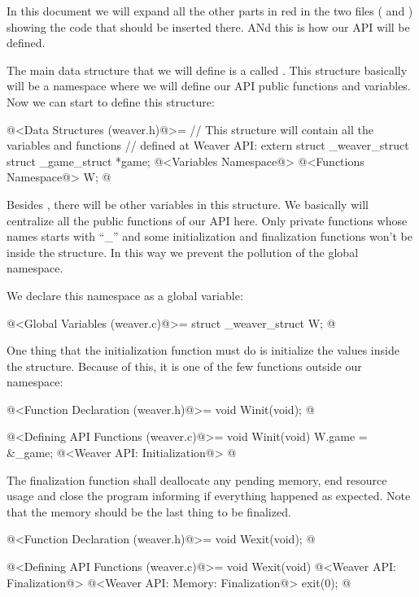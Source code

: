 In this document we will expand all the other parts in red in the two
files ( and ) showing the
code that should be inserted there. ANd this is how our API will be
defined.


The main data structure that we will define is a
 called . This structure
basically will be a namespace where we will define our API public
functions and variables. Now we can start to define this structure:

\iniciocodigo
@<Data Structures (weaver.h)@>=
// This structure will contain all the variables and functions
// defined at Weaver API:
extern struct _weaver_struct{
  struct _game_struct *game;
  @<Variables Namespace@>
  @<Functions Namespace@>
} W;
@
\fimcodigo

Besides , there will be other variables in this
structure. We basically will centralize all the public functions of
our API here. Only private functions whose names starts with ``\_''
and some initialization and finalization functions won't be inside
the  structure. In this way we prevent the pollution of
the global namespace.

We declare this namespace as a global variable:

\iniciocodigo
@<Global Variables (weaver.c)@>=
struct _weaver_struct W;
@
\fimcodigo


One thing that the initialization function must do is initialize the
values inside the  structure. Because of this, it is one
of the few functions outside our namespace:

\iniciocodigo
@<Function Declaration (weaver.h)@>=
void Winit(void);
@
\fimcodigo

\iniciocodigo
@<Defining API Functions (weaver.c)@>=
void Winit(void){
  W.game = &_game;
  @<Weaver API: Initialization@>
}
@
\fimcodigo

The finalization function shall deallocate any pending memory, end
resource usage and close the program informing if everything happened
as expected. Note that the memory should be the last thing to be
finalized.

\iniciocodigo
@<Function Declaration (weaver.h)@>=
void Wexit(void);
@
\fimcodigo

\iniciocodigo
@<Defining API Functions (weaver.c)@>=
void Wexit(void){
  @<Weaver API: Finalization@>
  @<Weaver API: Memory: Finalization@>
  exit(0);
}
@
\fimcodigo


